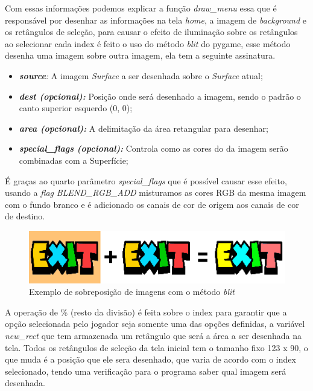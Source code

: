 \pagebreak
Com essas informações podemos explicar a função \textit{draw\_menu} essa que é responsável por desenhar as informações na tela \textit{home}, a imagem de \textit{background} e os retângulos de seleção, para causar o efeito de iluminação sobre os retângulos ao selecionar cada index é feito o uso do método \textit{blit} do pygame, esse método desenha uma imagem sobre outra imagem, ela tem a seguinte assinatura.
\begin{itemize}
    \item \textit{\textbf{source}:} A imagem \textit{Surface} a ser desenhada sobre o \textit{Surface} atual;
    \item \textit{\textbf{dest (opcional):}} Posição onde será desenhado a imagem, sendo o padrão o canto superior esquerdo (0, 0);
    \item \textit{\textbf{area (opcional):}} A delimitação da área retangular para desenhar;
    \item \textit{\textbf{special\_flags (opcional):}} Controla como as cores do da imagem serão combinadas com a Superfície;
\end{itemize}
É graças ao quarto parâmetro \textit{special\_flags} que é possível causar esse efeito, usando a \textit{flag} \textit{BLEND\_RGB\_ADD } misturamos as cores RGB da mesma imagem com o fundo branco e é adicionado os canais de cor de origem aos canais de cor de destino.

\begin{figure}[h!]
    \centering
    \includegraphics[width=1\linewidth]{figuras/blit_example.png}
    \caption{Exemplo de sobreposição de imagens com o método \textit{blit}}
    \label{fig:blit-example}
\end{figure}

A operação de \% (resto da divisão) é feita sobre o index para garantir que a opção selecionada pelo jogador seja somente uma das opções definidas, a variável \textit{new\_rect} que tem armazenada um retângulo que será a área a ser desenhada na tela. Todos os retângulos de seleção da tela inicial tem o tamanho fixo 123 x 90, o que muda é a posição que ele sera desenhado, que varia de acordo com o index selecionado, tendo uma verificação para o programa saber qual imagem será desenhada.

